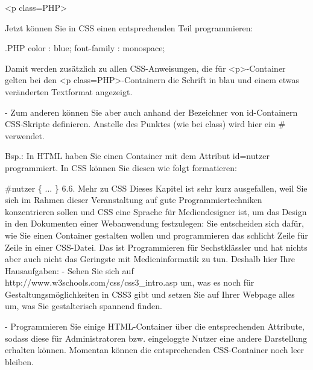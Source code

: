<p class=PHP>

Jetzt können Sie in CSS einen entsprechenden Teil programmieren:

.PHP {
	color : blue;
	font-family : monospace;
}

Damit werden zusätzlich zu allen CSS-Anweisungen, die für <p>-Container gelten bei den <p class=PHP>-Containern die Schrift in blau und einem etwas veränderten Textformat angezeigt.

-	Zum anderen können Sie aber auch anhand der Bezeichner von id-Containern CSS-Skripte definieren. Anstelle des Punktes (wie bei class) wird hier ein \# verwendet.

Bsp.: In HTML haben Sie einen Container mit dem Attribut id=nutzer programmiert.
In CSS können Sie diesen wie folgt formatieren:

\#nutzer \{ ... \}
6.6.	Mehr zu CSS
Dieses Kapitel ist sehr kurz ausgefallen, weil Sie sich im Rahmen dieser Veranstaltung auf gute Programmiertechniken konzentrieren sollen und CSS eine Sprache für Mediendesigner ist, um das Design in den Dokumenten einer Webanwendung festzulegen: Sie entscheiden sich dafür, wie Sie einen Container gestalten wollen und programmieren das schlicht Zeile für Zeile in einer CSS-Datei. Das ist Programmieren für Sechstklässler und hat nichts aber auch nicht das Geringste mit Medieninformatik zu tun.
Deshalb hier Ihre Hausaufgaben:
-	Sehen Sie sich auf http://www.w3schools.com/css/css3\_intro.asp um, was es noch für Gestaltungsmöglichkeiten in CSS3 gibt und setzen Sie auf Ihrer Webpage alles um, was Sie gestalterisch spannend finden.

-	Programmieren Sie einige HTML-Container über die entsprechenden Attribute, sodass diese für Administratoren bzw. eingeloggte Nutzer eine andere Darstellung erhalten können. Momentan können die entsprechenden CSS-Container noch leer bleiben.

